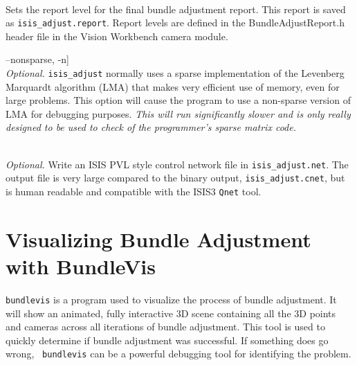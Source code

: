 \begin{description}
\item[--report-level, -r \textnormal{\small{(default = 10)}}] \hfill \\

  Sets the report level for the final bundle adjustment report.  This
  report is saved as \verb=isis_adjust.report=. Report levels are
  defined in the BundleAdjustReport.h header file in the Vision
  Workbench camera module.

\item--nonsparse, -n] \hfill \\

  \emph{Optional.} {\tt isis\_adjust} normally uses a sparse
  implementation of the Levenberg Marquardt algorithm (LMA) that makes
  very efficient use of memory, even for large problems.  This option
  will cause the program to use a non-sparse version of LMA for
  debugging purposes.  \emph{This will run significantly slower and is
    only really designed to be used to check of the programmer's
    sparse matrix code.}

\item[--write-isis-cnet-also] \hfill \\

  \emph{Optional.} Write an ISIS PVL style control network file in
  \verb=isis_adjust.net=. The output file is very large compared to
  the binary output, \verb=isis_adjust.cnet=, but is human readable
  and compatible with the ISIS3 \texttt{Qnet} tool.

\end{description}


\section{Visualizing Bundle Adjustment with BundleVis}

\texttt{bundlevis} is a program used to visualize the process of
bundle adjustment. It will show an animated, fully interactive 3D
scene containing all the 3D points and cameras across all iterations
of bundle adjustment.  This tool is used to quickly determine if
bundle adjustment was successful.  If something does go wrong, {\tt
  bundlevis} can be a powerful debugging tool for identifying the
problem.


